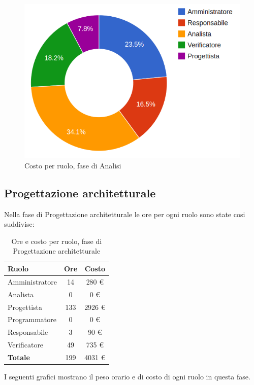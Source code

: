 \begin{figure}[H]
\centering
\includegraphics[scale=0.35]{5-1-2.png}
\caption{Costo per ruolo, fase di Analisi\label{fig:nome}}
\end{figure}

\subsection{Progettazione architetturale}

Nella fase di Progettazione architetturale le ore per ogni ruolo sono state cosi suddivise:

\begin{table}[H]
	\centering
	\begin{tabular}{ l c c }
	\textbf{Ruolo} & \textbf{Ore} & \textbf{Costo} \\
	\hline
	Amministratore & 14 & 280 €\\
	Analista & 0 & 0 €\\
	Progettista & 133 & 2926 €\\
	Programmatore & 0 & 0 €\\
	Responsabile & 3 & 90 €\\
	Verificatore & 49 & 735 €\\
	\hline
	\textbf{Totale} & 199 & 4031 €\\
	\hline
	\end{tabular}
	\caption{Ore e costo per ruolo, fase di Progettazione architetturale}
	\end{table}
	
I seguenti grafici mostrano il peso orario e di costo di ogni ruolo in questa fase.

